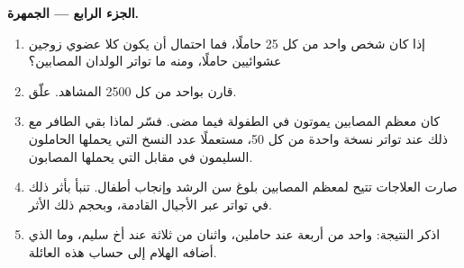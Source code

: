 \begin{problem}
\medskip
\noindent\textbf{الجزء الرابع --- الجمهرة.}
\begin{enumerate}[resume]
  \item إذا كان شخص واحد من كل 25 حاملًا، فما احتمال أن يكون كلا
        عضوي زوجين عشوائيين حاملًا، ومنه ما تواتر الولدان المصابين؟
  \item قارن بواحد من كل 2500 المشاهد. علّق.
  \item كان معظم المصابين يموتون في الطفولة فيما مضى. فسّر لماذا بقي
         الطافر مع ذلك عند تواتر نسخة واحدة من كل 50، مستعملًا
        عدد النسخ التي يحملها الحاملون السليمون في مقابل التي يحملها
        المصابون.
  \item صارت العلاجات تتيح لمعظم المصابين بلوغ سن الرشد وإنجاب أطفال.
        تنبأ بأثر ذلك في تواتر  عبر الأجيال القادمة، وبحجم ذلك
        الأثر.
  \item اذكر النتيجة: واحد من أربعة عند حاملين، واثنان من ثلاثة عند
        أخ سليم، وما الذي أضافه الهلام إلى حساب هذه العائلة.
\end{enumerate}
\end{problem}
